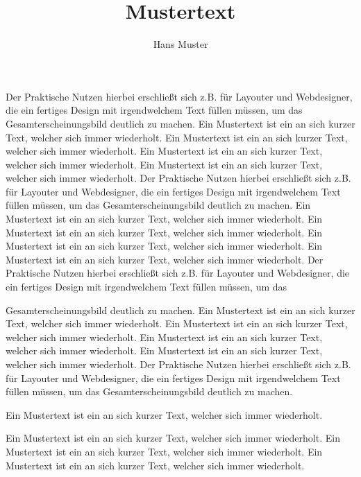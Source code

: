 \documentclass{article}
\title{Mustertext}
\author{Hans Muster}
\begin{document}
\maketitle

Der Praktische Nutzen hierbei erschließt sich z.B. für Layouter und Webdesigner, die ein fertiges Design mit irgendwelchem Text füllen müssen, um das Gesamterscheinungsbild deutlich zu machen. Ein Mustertext ist ein an sich kurzer Text, welcher sich immer wiederholt. Ein Mustertext ist ein an sich kurzer Text, welcher sich immer wiederholt.\cite{Article} Ein
Mustertext ist ein an sich kurzer Text, welcher sich immer wiederholt. Ein Mustertext ist ein an sich kurzer Text, welcher sich immer wiederholt. Der Praktische Nutzen hierbei erschließt sich z.B. für Layouter und Webdesigner, die ein fertiges Design mit irgendwelchem Text füllen müssen, um das Gesamterscheinungsbild deutlich zu machen. Ein Mustertext ist ein an sich kurzer Text, welcher sich immer wiederholt. Ein Mustertext ist ein an sich kurzer Text, welcher sich immer wiederholt. Ein Mustertext ist ein an sich kurzer Text, welcher sich immer wiederholt. Ein Mustertext ist ein an sich kurzer Text, welcher sich immer wiederholt. Der Praktische Nutzen hierbei erschließt sich z.B. für Layouter und Webdesigner, die ein fertiges Design mit irgendwelchem Text füllen müssen, um das

Gesamterscheinungsbild deutlich zu machen. Ein Mustertext ist ein an sich kurzer Text, welcher sich immer wiederholt. Ein Mustertext ist ein an sich kurzer Text, welcher sich immer wiederholt. Ein Mustertext ist ein an sich kurzer Text, welcher sich immer wiederholt. Ein Mustertext ist ein an sich kurzer Text, welcher sich immer wiederholt. Der Praktische Nutzen hierbei erschließt sich z.B. für Layouter und Webdesigner, die ein fertiges Design mit irgendwelchem Text füllen müssen, um das Gesamterscheinungsbild deutlich zu machen.\cite{youyourwatchandyourself}

\begin{center}
    Ein Mustertext
    ist ein an
    sich kurzer
    Text,
    welcher
	sich immer wiederholt.\cite{ZeitistGeld}
\end{center}
Ein Mustertext ist ein an sich kurzer Text, welcher sich immer wiederholt. Ein Mustertext ist ein an sich kurzer Text, welcher sich immer wiederholt. Ein Mustertext ist ein an sich kurzer Text, welcher sich immer wiederholt. 



\end{document}

